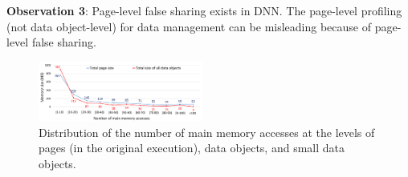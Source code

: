 \textbf{Observation 3}: Page-level false sharing exists in DNN. The page-level profiling (not data object-level) for data management can be misleading because of page-level false sharing. 


\begin{figure}[!th]
\centering
\includegraphics[width=0.48\textwidth]{figures/figure4.pdf}
\caption{Distribution of the number of main memory accesses at the levels of pages (in the original execution), data objects, and small data objects.}
\label{fig:size_diff}
\end{figure}







